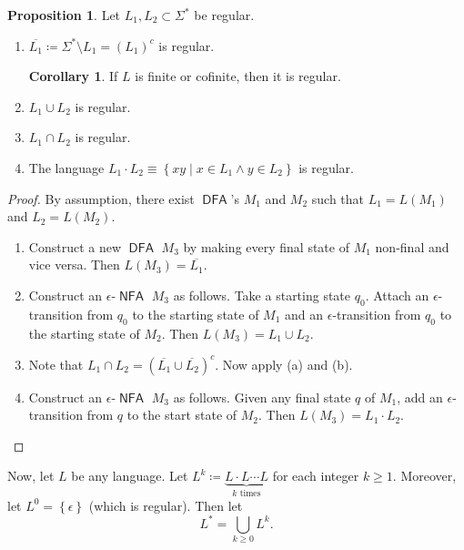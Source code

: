 \documentclass[10pt,letterpaper,cm]{nupset}
\theoremstyle{definition}
\theoremstyle{theorem}
\newtheorem{prop}[definition]{Proposition}
\newtheorem{corollary}[definition]{Corollary}
\theoremstyle{remark}
\newcommand{\1}{\mathbf{1}}
\newcommand{\0}{\vec 0}
\DeclareMathOperator{\DFA}{\mathsf{DFA}}
\DeclareMathOperator{\NFA}{\mathsf{NFA}}
\begin{document}
\begin{prop} Let $L_1, L_2\subset \Sigma^{\ast}$ be regular. 
\begin{enumerate}[label=(\alph*)]
\item $\overline{L_1}\coloneqq \Sigma^{\ast} \setminus L_1 = \left(L_1\right)^c$ is regular.
\begin{corollary}
If $L$ is finite or cofinite, then it is regular.
\end{corollary}
\item $L_1 \cup L_2$ is regular.
\item $L_1 \cap L_2$ is regular. 
\item The language $L_1\cdot L_2 \equiv  \left\{xy \mid x\in L_1 \land y\in L_2\right\}$ is regular. 
\end{enumerate}
\end{prop} 
\begin{proof} By assumption, there exist $\DFA$'s $M_1$ and $M_2$ such that $L_1 = L(M_1)$ and $L_2 = L(M_2)$.
\begin{enumerate}[label=(\alph*)]
\item Construct a new $\DFA$ $M_3$ by making every final state of $M_1$ non-final and vice versa. Then $L(M_3) = \overline{L_1}$.
\item Construct an $\epsilon{\text{-}}\NFA$ $M_3$ as follows. Take a starting state $q_0$. Attach  an $\epsilon$-transition  from $q_0$ to the starting state of $M_1$  and  an $\epsilon$-transition from $q_0$ to the starting state of $M_2$. Then $L(M_3) = L_1 \cup L_2$.
\item Note that $L_1 \cap L_2 = \left(\overline{L_1} \cup \overline{L_2}\right)^c$.  Now apply (a) and (b).
\item Construct an $\epsilon{\text{-}}\NFA$ $M_3$ as follows. Given any final state $q$ of $M_1$, add an $\epsilon$-transition from $q$ to the start state of $M_2$. Then $L(M_3) = L_1\cdot L_2$.
\end{enumerate}
\end{proof}

\medskip

Now, let $L$ be any language. Let $L^k \coloneqq \underbrace{L\cdot L \cdots L}_{k \text{ times}}$ for each integer $k\geq 1$. Moreover, let $L^0 = \left\{\epsilon\right\}$ (which is regular). Then let $$L^{\ast} = \bigcup_{k\geq 0} L^k.$$

\medskip
\end{document}
